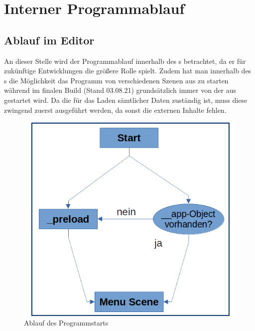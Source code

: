 \chapter{Interner Programmablauf}
\label{cha:internal_seq}
\section{Ablauf im Editor}
\label{sec:inside_editor}
%
An dieser Stelle wird der Programmablauf innerhalb des \uedit{}s betrachtet, da er für zukünftige Entwicklungen die größere Rolle spielt. Zudem hat man innerhalb des \uedit{}s die Möglichkeit das Programm von verschiedenen Szenen aus zu starten während im finalen Build (Stand 03.08.21) grundsätzlich immer von der \pres{} aus gestartet wird. Da die \pres{} für das Laden sämtlicher Daten zuständig ist, muss diese zwingend zuerst ausgeführt werden, da sonst die externen Inhalte fehlen.
%
\begin{figure}[htp]
	\centering
	\includegraphics[width=.65\linewidth]{img/basic_start}
	\caption[structure]{Ablauf des Programmstarts}
	\label{fig:basic_start}
\end{figure}
%
\pagebreak
%

